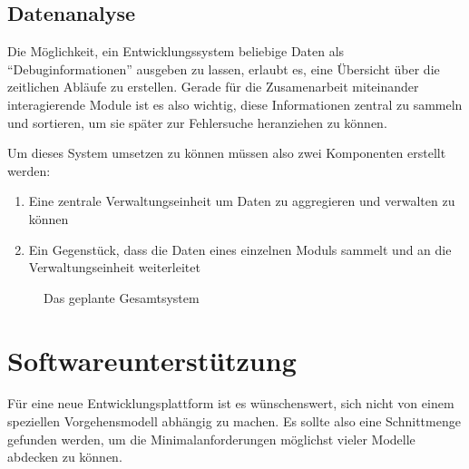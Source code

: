 \subsection{Datenanalyse} Die Möglichkeit, ein Entwicklungssystem beliebige
Daten als "`Debuginformationen"' ausgeben zu lassen, erlaubt es, eine
Übersicht über die zeitlichen Abläufe zu erstellen. Gerade für die
Zusamenarbeit miteinander interagierende Module ist es also wichtig, diese
Informationen zentral zu sammeln und sortieren, um sie später zur
Fehlersuche heranziehen zu können.

Um dieses System umsetzen zu können müssen also zwei Komponenten erstellt
werden:
\begin{enumerate}
  \item Eine zentrale Verwaltungseinheit um Daten zu aggregieren und verwalten
  zu können
  \item Ein Gegenstück, dass die Daten eines einzelnen Moduls sammelt und an die
  Verwaltungseinheit weiterleitet
\end{enumerate}
\begin{figure}[!h]
\centering
\def\svgwidth{\columnwidth}

\caption{Das geplante Gesamtsystem}
\end{figure}

\iffalse

\section{Softwareunterstützung}
Für eine neue Entwicklungsplattform ist es wünschenswert, sich nicht von einem
speziellen Vorgehensmodell abhängig zu machen. Es sollte also eine Schnittmenge
gefunden werden, um die Minimalanforderungen möglichst vieler Modelle abdecken
zu können.

